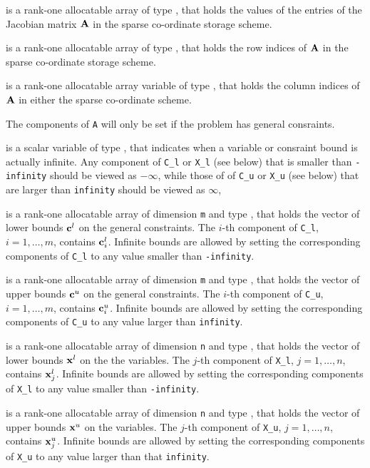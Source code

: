 \documentclass{galahad}
\begin{document}
\begin{description}
\begin{description}
 is a rank-one allocatable array of type \realdp, that holds
the values of the entries of the Jacobian matrix ${\mathbf{A}}$
in the sparse co-ordinate storage scheme.

 is a rank-one allocatable array of type \integer,
that holds the row indices of ${\mathbf{A}}$ in the sparse co-ordinate storage scheme.

 is a rank-one allocatable array variable of type \integer,
that holds the column indices of ${\mathbf{A}}$ in either the sparse co-ordinate scheme.
\end{description}

The components of {\tt A} will only be set if the problem has general
consraints.

 is a scalar variable of type \realdp, that indicates
when a variable or consraint bound is actually infinite. Any component
of {\tt C\_l} or {\tt X\_l} (see below) that is smaller than {\tt -infinity}
should be viewed as $- \infty$, while those of
of {\tt C\_u} or {\tt X\_u} (see below) that are larger than {\tt infinity}
should be viewed as $\infty$,

 is a rank-one allocatable array of dimension {\tt m} and type
\realdp, that holds the vector of lower bounds ${\mathbf{c}}^{l}$
on the general constraints. The $i$-th component of
{\tt C\_l}, $i = 1, \ldots , m$, contains ${\mathbf{c}}_{i}^{l}$.
Infinite bounds are allowed by setting the corresponding
components of {\tt C\_l} to any value smaller than {\tt -infinity}.

 is a rank-one allocatable array of dimension {\tt m} and type
\realdp, that holds the vector of upper bounds ${\mathbf{c}}^{u}$
on the general constraints. The $i$-th component of
{\tt C\_u}, $i = 1,  \ldots ,  m$, contains ${\mathbf{c}}_{i}^{u}$.
Infinite bounds are allowed by setting the corresponding
components of {\tt C\_u} to any value larger than {\tt infinity}.

 is a rank-one allocatable array of dimension {\tt n} and type
\realdp, that holds
the vector of lower bounds ${\mathbf{x}}^{l}$ on the the variables.
The $j$-th component of {\tt X\_l}, $j = 1, \ldots , n$,
contains ${\mathbf{x}}_{j}^{l}$.
Infinite bounds are allowed by setting the corresponding
components of {\tt X\_l} to any value smaller than {\tt -infinity}.

 is a rank-one allocatable array of dimension {\tt n} and type
\realdp, that holds
the vector of upper bounds ${\mathbf{x}}^{u}$ on the variables.
The $j$-th component of {\tt X\_u}, $j = 1, \ldots , n$,
contains ${\mathbf{x}}_{j}^{u}$.
Infinite bounds are allowed by setting the corresponding
components of {\tt X\_u} to any value larger than that {\tt infinity}.


\end{description}
\end{document}
